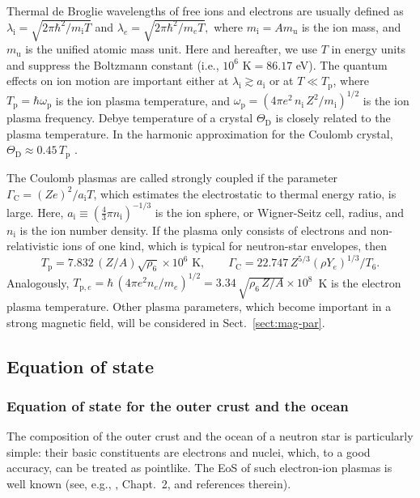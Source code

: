 \documentclass[smallextended]{svjour3}       %
\newcommand{\beq}{\begin{equation}}
\newcommand{\eeq}{\end{equation}}
\newcommand{\aion}{a_\mathrm{i}}
\newcommand{\Gami}{\Gamma_{\mathrm{C}}}
\newcommand{\lambde}{\lambda_e}
\newcommand{\lambdi}{\lambda_\mathrm{i}}
\newcommand{\mel}{m_e}
\newcommand{\mion}{m_\mathrm{i}}
\newcommand{\nion}{n_\mathrm{i}}
\newcommand{\omp}{\omega_\mathrm{p}}
\newcommand{\Tp}{T_\mathrm{p}}
\newcommand{\Tpe}{T_{\mathrm{p},e}}
\begin{document}
Thermal de Broglie wavelengths of free ions and electrons are
usually defined as
$
   \lambdi = \sqrt{2\pi\hbar^2/\mion T}
$
and
$
   \lambde = \sqrt{2\pi\hbar^2/ \mel
T},
$
where $\mion=Am_\mathrm{u}$ is the ion
mass, and $m_\mathrm{u}$ is the unified atomic mass unit.
Here and hereafter, we use $T$ in energy
units and suppress the Boltzmann constant
(i.e., $10^6\mbox{ K}=86.17$ eV).
The quantum effects on ion motion are important
either at $\lambdi\gtrsim \aion$ or at 
$T \ll \Tp$, where $\Tp = \hbar \omp$
is the ion plasma temperature, and
$
    \omp = \left(  {4 \pi e^2 \,\nion}\,
     Z^2 /\mion \right)^{1/2}
$
is the ion plasma frequency. Debye temperature of a crystal
$\Theta_\mathrm{D}$
is closely related to the plasma temperature. In the
harmonic approximation for the Coulomb crystal, 
$\Theta_\mathrm{D} \approx 0.45\,\Tp$ \citep{Carr61}.

The Coulomb plasmas are called strongly coupled if the
parameter $\Gami=(Z e)^2/\aion T$, which estimates the
electrostatic to thermal energy ratio, is large. Here,
$\aion\equiv(\frac43\pi \nion)^{-1/3}$ is the ion sphere, or Wigner-Seitz cell, radius,
and $\nion$ is the ion number density.
If the plasma only consists
of electrons and non-relativistic ions of one kind, which is
typical for neutron-star envelopes, then
\beq
\Tp = 7.832\, (Z/A)\sqrt{\rho_6}\times10^6\mbox{~K},
\qquad
\Gami = 22.747 \,Z^{5/3}(\rho Y_e)^{1/3}/T_6.
\eeq
Analogously, $\Tpe = \hbar\, (4\pi e^2 n_e/\mel)^{1/2}
= 3.34\,\sqrt{\rho_6\, Z/A}\times10^8$~K is the
electron plasma temperature.
Other plasma parameters, which become important in a strong
magnetic field, will be considered in
Sect.~\ref{sect:mag-par}.

\subsection{Equation of state}
\label{sect:EOS}

\subsubsection{Equation of state for the outer crust and the
ocean}
\label{sect:EOSouter}

The composition of the outer crust and the ocean of a
neutron star is particularly simple: their basic
constituents are electrons and nuclei, which, to a good
accuracy, can be treated as pointlike. The EoS of such
electron-ion plasmas is well known (see, e.g.,
\citealt{HPY07}, Chapt.~2, and references therein). 
\end{document}
